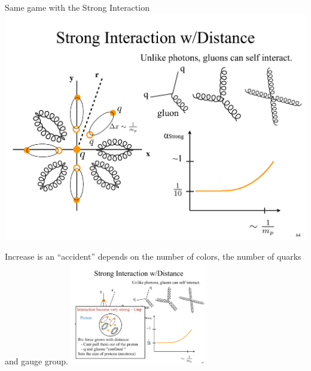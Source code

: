 {\lineacross

\clearpage

Same game with the Strong Interaction
\bc
\includegraphics[width=1\textwidth]{./StrongInteractionVsDistance.pdf}
\ec

Increase is an ``accident'' depends on the number of colors, the number of quarks and gauge group.
\bc
\includegraphics[width=0.45\textwidth]{./Proton.pdf}
\ec

  


}



